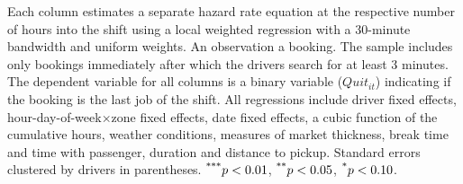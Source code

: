 \documentclass[reviewmode,AEJ]{AEA}
\begin{document}
\begin{table}[]
	\begin{tablenotes}
		\small
        Each column estimates a separate hazard rate equation at the respective number of hours into the shift using a local weighted regression with a 30-minute bandwidth and uniform weights. An observation a booking. The sample includes only bookings immediately after which the drivers search for at least 3 minutes. The dependent variable for all columns is a binary variable ($Quit_{it}$) indicating if the booking is the last job of the shift. All regressions include driver fixed effects, hour-day-of-week\(\times\)zone fixed effects, date fixed effects, a cubic function of the cumulative hours, weather conditions, measures of market thickness, break time and time with passenger, duration and distance to pickup. Standard errors clustered by drivers in parentheses. $\textsuperscript{***}p < 0.01$, $\textsuperscript{**}p < 0.05$, $\textsuperscript{*}p < 0.10$. 
	\end{tablenotes}
\end{table}
\end{document}
